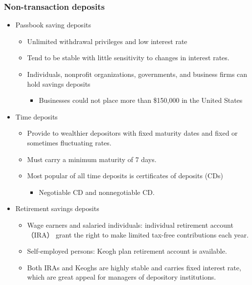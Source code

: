


\subsubsection{Non-transaction deposits}
\begin{itemize}
\item Passbook saving deposits
    \begin{itemize}
    \item Unlimited withdrawal privileges and low interest rate
    \item Tend to be stable with little sensitivity to changes in interest rates.
    \item Individuals, nonprofit organizations, governments, and business firms can hold savings deposits
        \begin{itemize}
        \item Businesses could not place more than \$150,000 in the United States
        \end{itemize}
    \end{itemize}
\item Time deposits
    \begin{itemize}
    \item Provide to wealthier depositors with fixed maturity dates and fixed or sometimes fluctuating rates.
    \item Must carry a minimum maturity of 7 days.
    \item Most popular of all time deposits is certificates of deposits (CDs)
        \begin{itemize}
        \item Negotiable CD and nonnegotiable CD.
        \end{itemize}
    \end{itemize}
\item Retirement savings deposits
    \begin{itemize}
    \item Wage earners and salaried individuals: individual retirement account （IRA） grant the right to make limited tax-free contributions each year.
    \item Self-employed persons: Keogh plan retirement account is available.
    \item Both IRAs and Keoghs are highly stable and carries fixed interest rate, which are great appeal for managers of depository institutions.
    \end{itemize}
\end{itemize}


